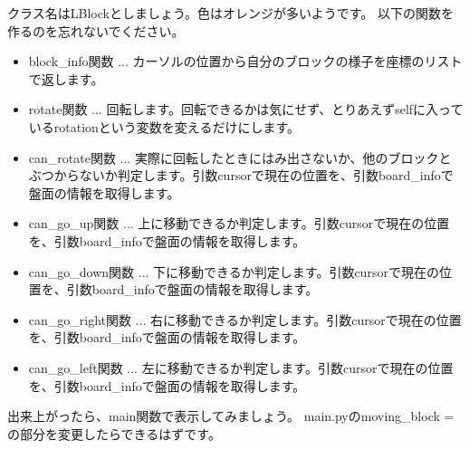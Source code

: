 クラス名はLBlockとしましょう。色はオレンジが多いようです。
以下の関数を作るのを忘れないでください。
\begin{itemize}
  \item block\_info関数 ... カーソルの位置から自分のブロックの様子を座標のリストで返します。
  \item rotate関数 ... 回転します。回転できるかは気にせず、とりあえずselfに入っているrotationという変数を変えるだけにします。
  \item can\_rotate関数 ... 実際に回転したときにはみ出さないか、他のブロックとぶつからないか判定します。引数cursorで現在の位置を、引数board\_infoで盤面の情報を取得します。
  \item can\_go\_up関数 ... 上に移動できるか判定します。引数cursorで現在の位置を、引数board\_infoで盤面の情報を取得します。
  \item can\_go\_down関数 ... 下に移動できるか判定します。引数cursorで現在の位置を、引数board\_infoで盤面の情報を取得します。
  \item can\_go\_right関数 ... 右に移動できるか判定します。引数cursorで現在の位置を、引数board\_infoで盤面の情報を取得します。
  \item can\_go\_left関数 ... 左に移動できるか判定します。引数cursorで現在の位置を、引数board\_infoで盤面の情報を取得します。
\end{itemize}
出来上がったら、main関数で表示してみましょう。
main.pyのmoving\_block = の部分を変更したらできるはずです。

